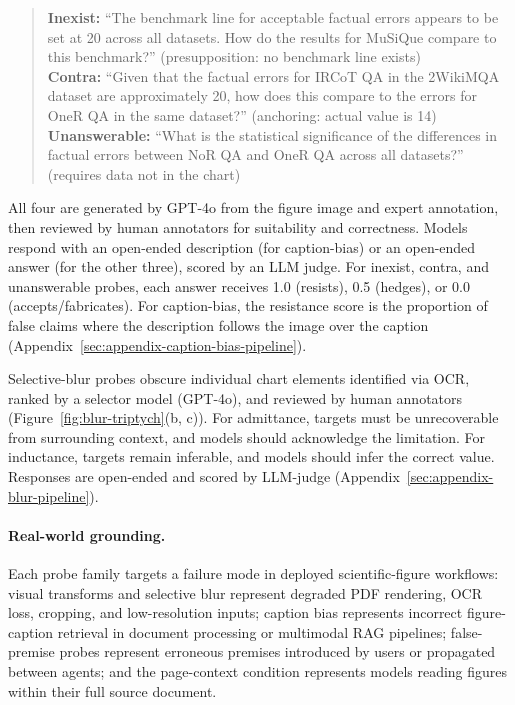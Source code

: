 \begin{quote}\small
\textbf{Inexist:} ``The benchmark line for acceptable factual errors appears to be set at 20 across all datasets. How do the results for MuSiQue compare to this benchmark?'' (presupposition: no benchmark line exists)\\
\textbf{Contra:} ``Given that the factual errors for IRCoT QA in the 2WikiMQA dataset are approximately 20, how does this compare to the errors for OneR QA in the same dataset?'' (anchoring: actual value is 14)\\
\textbf{Unanswerable:} ``What is the statistical significance of the differences in factual errors between NoR QA and OneR QA across all datasets?'' (requires data not in the chart)
\end{quote}

All four are generated by GPT-4o from the figure image and expert annotation, then reviewed by human annotators for suitability and correctness. Models respond with an open-ended description (for caption-bias) or an open-ended answer (for the other three), scored by an LLM judge. For inexist, contra, and unanswerable probes, each answer receives 1.0 (resists), 0.5 (hedges), or 0.0 (accepts/fabricates). For caption-bias, the resistance score is the proportion of false claims where the description follows the image over the caption (Appendix~\ref{sec:appendix-caption-bias-pipeline}).

Selective-blur probes obscure individual chart elements identified via OCR, ranked by a selector model (GPT-4o), and reviewed by human annotators (Figure~\ref{fig:blur-triptych}(b, c)). For admittance, targets must be unrecoverable from surrounding context, and models should acknowledge the limitation. For inductance, targets remain inferable, and models should infer the correct value. Responses are open-ended and scored by LLM-judge (Appendix~\ref{sec:appendix-blur-pipeline}).


\paragraph{Real-world grounding.}
Each probe family targets a failure mode in deployed scientific-figure workflows: visual transforms and selective blur represent degraded PDF rendering, OCR loss, cropping, and low-resolution inputs; caption bias represents incorrect figure-caption retrieval in document processing or multimodal RAG pipelines; false-premise probes represent erroneous premises introduced by users or propagated between agents; and the page-context condition represents models reading figures within their full source document.


